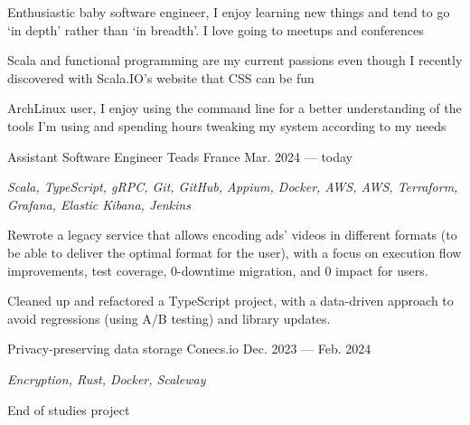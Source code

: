 \begin{MainPart}
  \color{Black}
  \vspace{0.25cm}
  {
    \vspace{-\baselineskip}
    \begin{flushleft}
      Enthusiastic baby software engineer, I enjoy learning new things and tend to go `in depth' rather than `in breadth'. I love going to meetups and conferences

      \vspace{0.5\baselineskip}
      Scala and functional programming are my current passions even though I recently discovered with Scala.IO's website that CSS can be fun

      \vspace{0.5\baselineskip}
      ArchLinux user, I enjoy using the command line for a better understanding of the tools I'm using and spending hours tweaking my system according to my needs
    \end{flushleft}
  }

  \Experience%
  {Assistant Software Engineer}
  {Teads France}
  {Mar. 2024 --- today}
  {
    \textit{Scala, TypeScript, gRPC, Git, GitHub, Appium, Docker, AWS, AWS, Terraform, Grafana, Elastic Kibana, Jenkins}

    \begin{ItemList}{\ColorHighlight}
      \item[\ding{226}] Rewrote a legacy service that allows encoding ads' videos in different formats (to be able to deliver the optimal format for the user), with a focus on execution flow improvements, test coverage, 0-downtime migration, and 0 impact for users.
      \item[\ding{226}] Cleaned up and refactored a TypeScript project, with a data-driven approach to avoid regressions (using A/B testing) and library updates.
    \end{ItemList}
  }
  \Experience%
  {Privacy-preserving data storage}
  {Conecs.io}
  {Dec. 2023 --- Feb. 2024}
  {
    \textit{Encryption, Rust, Docker, Scaleway}

    End of studies project

}
\end{MainPart}
